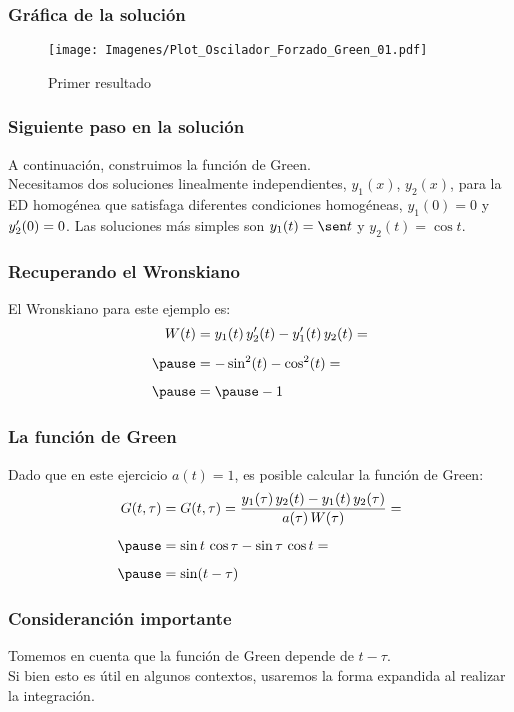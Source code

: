 \documentclass[12pt]{beamer}
\begin{document}
\begin{frame}
\frametitle{Gráfica de la solución}
\begin{figure}[H]
    \centering
    \texttt{[image: Imagenes/Plot\_Oscilador\_Forzado\_Green\_01.pdf]}
    \caption{Primer resultado}
    \label{fig:figura_01}
\end{figure} 
\end{frame}
\begin{frame}
\frametitle{Siguiente paso en la solución}
A continuación, construimos la función de Green.
\\
\bigskip
\pause
Necesitamos dos soluciones linealmente independientes, $y_{1} (x)$, $y_{2} (x)$, para la ED homogénea que satisfaga diferentes condiciones homogéneas, $y_{1} (0) = 0$ y ${y}^{\prime}_{2} (0) = 0$. \pause Las soluciones más simples son $y_{1} (t) = \sen t$ y $y_{2} (t) = \cos t$.
\end{frame}

\begin{frame}
\frametitle{Recuperando el Wronskiano}
El Wronskiano para este ejemplo es:
\pause
\begin{eqnarray*}
\begin{aligned}
W (t) &= y_{1} (t) \, \pderivada{y}_{2} (t) - \pderivada{y}_{1} (t) \, y_{2} (t) = \\[0.5em] \pause
&=  - \sin^{2} (t) - \cos^{2} (t) = \\[0.5em] \pause
&= \pause - 1 
\end{aligned}
\end{eqnarray*}
\end{frame}

\begin{frame}
\frametitle{La función de Green}
Dado que en este ejercicio $a (t) = 1$, es posible calcular la función de Green:
\pause
\begin{eqnarray}
\begin{aligned}[b]
G (t, \tau) &= G (t, \tau) = \dfrac{y_{1} (\tau) \, y_{2} (t) - y_{1} (t) \, y_{2} (\tau)}{a (\tau) \, W (\tau)} = \\[0.5em] \pause
&= \sin t \, \cos \tau - \sin \tau \, \cos t = \\[0.5em] \pause
&= \sin (t - \tau)
\end{aligned}
\label{eq:ecuacion_07_23}
\end{eqnarray}
\end{frame}

\begin{frame}
\frametitle{Consideranción importante}
Tomemos en cuenta que la función de Green depende de $t - \tau$.
\\
\bigskip
\pause
Si bien esto es útil en algunos contextos, usaremos la forma expandida al realizar la integración.
\end{frame}
\end{document}

